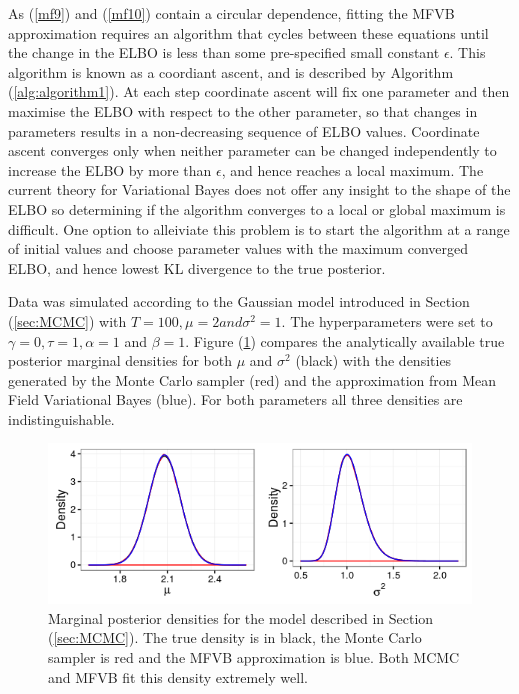 \documentclass[12pt,a4paper]{article}%
\numberwithin{equation}{section}
\begin{document}
As (\ref{mf9}) and (\ref{mf10}) contain a circular dependence, fitting the MFVB approximation requires an algorithm that cycles between these equations until the change in the ELBO is less than some pre-specified small constant $\epsilon$. This algorithm is known as a coordiant ascent, and is described by Algorithm (\ref{alg:algorithm1}). At each step coordinate ascent will fix one parameter and then maximise the ELBO with respect to the other parameter, so that changes in parameters results in a non-decreasing sequence of ELBO values. Coordinate ascent converges only when neither parameter can be changed independently to increase the ELBO by more than $\epsilon$, and hence reaches a local maximum.
The current theory for Variational Bayes does not offer any insight to the shape of the ELBO so determining if the algorithm converges to a local or global maximum is difficult. One option to alleiviate this problem is to start the algorithm at a range of initial values and choose parameter values with the maximum converged ELBO, and hence lowest KL divergence to the true posterior. 

Data was simulated according to the Gaussian model introduced in Section (\ref{sec:MCMC}) with $T = 100, \mu = 2 and \sigma^2 = 1$. The hyperparameters were set to $\gamma = 0, \tau = 1, \alpha = 1$ and $\beta = 1$. Figure (\ref{fig:norminvg}) compares the analytically available true posterior marginal densities for both $\mu$ and $\sigma^2$ (black) with the densities generated by the Monte Carlo sampler (red) and the approximation from Mean Field Variational Bayes (blue). For both parameters all three densities are indistinguishable.

\begin{figure}[h]
\centering
\includegraphics[width=0.7\linewidth,height=\textheight,keepaspectratio]{norminvg}
\caption{Marginal posterior densities for the model described in Section (\ref{sec:MCMC}). The true density is in black, the Monte Carlo sampler is red and the MFVB approximation is blue. Both MCMC and MFVB fit this density extremely well.}
\label{fig:norminvg}
\end{figure}
\end{document}
